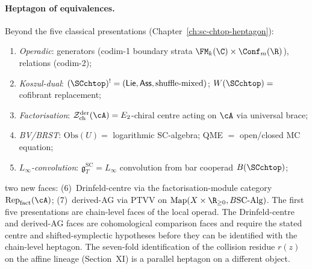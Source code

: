 \paragraph{Heptagon of equivalences.}
Beyond the five classical presentations
(Chapter~\ref{ch:sc-chtop-heptagon}):
\begin{enumerate}[label=(\arabic*)]
\item \emph{Operadic}: generators (codim-1 boundary strata
 $\FM_k(\C)\times\Conf_m(\R)$), relations (codim-2);
\item \emph{Koszul-dual}:
 $(\SCchtop)^! = (\mathsf{Lie},\mathsf{Ass},\text{shuffle-mixed})$;
 $W(\SCchtop) = $ cofibrant replacement;
\item \emph{Factorisation}:
 $\cZ^{\mathrm{der}}_{\mathrm{ch}}(\cA) =
 E_2$-chiral centre acting on $\cA$ via universal brace;
\item \emph{BV/BRST}:
 $\mathrm{Obs}(U) = $ logarithmic SC-algebra; QME $=$
 open/closed MC equation;
\item \emph{$L_\infty$-convolution}:
 $\mathfrak{g}^{\mathrm{SC}}_T = L_\infty$ convolution from bar
 cooperad $B(\SCchtop)$;
\end{enumerate}
two new faces: (6)~Drinfeld-centre via the factorisation-module
category $\mathrm{Rep}_{\mathrm{fact}}(\cA)$; (7)~derived-AG via
PTVV on $\mathrm{Map}(X \times \R_{\ge 0}, B \mathrm{SC\text{-}Alg})$.
The first five presentations are chain-level faces of the local
operad. The Drinfeld-centre and derived-AG faces are cohomological
comparison faces and require the stated centre and shifted-symplectic
hypotheses before they can be identified with the chain-level
heptagon. The seven-fold identification of the collision residue
$r(z)$ on the affine lineage (Section~XI) is a parallel heptagon on
a different object.

